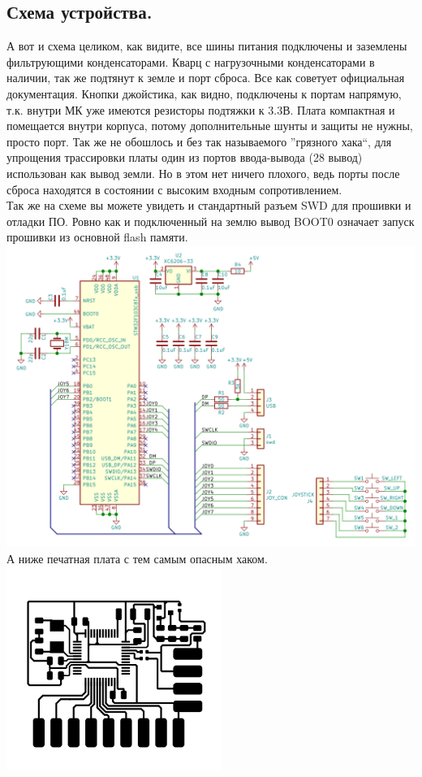 \documentclass[12pt,a4paper]{article}
\begin{document}
\subsection{Схема устройства.}
    А вот и схема целиком, как видите, все шины питания подключены и
    заземлены фильтрующими конденсаторами. Кварц с нагрузочными конденсаторами
    в наличии, так же подтянут к земле и порт сброса. Все как советует официальная документация.
    Кнопки джойстика, как видно, подключены к портам напрямую, т.к. внутри МК
    уже имеются резисторы подтяжки к 3.3В. Плата компактная и помещается внутри
    корпуса, потому дополнительные шунты и защиты не нужны, просто порт.
    Так же не обошлось и без так
    называемого ''грязного хака``, для упрощения трассировки платы один из
    портов ввода-вывода (28 вывод) использован как вывод земли. Но в этом нет ничего плохого,
    ведь порты после сброса находятся в состоянии с высоким входным
    сопротивлением.\\
    Так же на схеме вы можете увидеть и стандартный разъем SWD для прошивки
    и отладки ПО. Ровно как и подключенный на землю вывод BOOT0 означает
    запуск прошивки из основной flash памяти.\\
\includegraphics[width=15cm]{sch.png}\\
    А ниже печатная плата с тем самым опасным хаком.\\
\includegraphics[width=7cm]{pcb.png}
\end{document}
